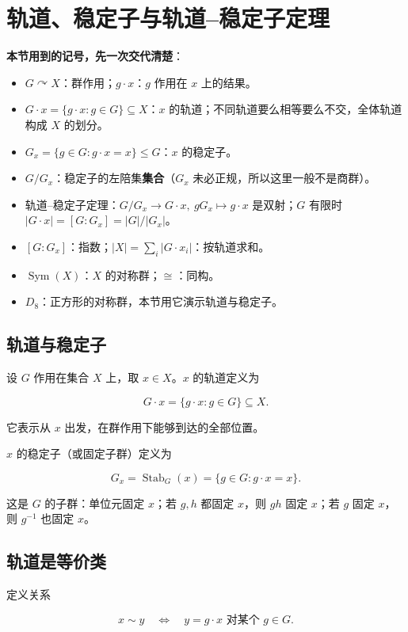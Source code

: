 \section{轨道、稳定子与轨道--稳定子定理}


\textbf{本节用到的记号，先一次交代清楚}：

\begin{itemize}
\item $G\curvearrowright X$：群作用；$g\cdot x$：$g$ 作用在 $x$ 上的结果。
\item $G\cdot x=\{g\cdot x:g\in G\}\subseteq X$：$x$ 的轨道；不同轨道要么相等要么不交，全体轨道构成 $X$ 的划分。
\item $G_x=\{g\in G:g\cdot x=x\}\le G$：$x$ 的稳定子。
\item $G/G_x$：稳定子的左陪集\textbf{集合}（$G_x$ 未必正规，所以这里一般不是商群）。
\item 轨道--稳定子定理：$G/G_x\to G\cdot x,\ gG_x\mapsto g\cdot x$ 是双射；$G$ 有限时 $|G\cdot x|=[G:G_x]=|G|/|G_x|$。
\item $[G:G_x]$：指数；$|X|=\sum_i|G\cdot x_i|$：按轨道求和。
\item $\operatorname{Sym}(X)$：$X$ 的对称群；$\cong$：同构。
\item $D_8$：正方形的对称群，本节用它演示轨道与稳定子。
\end{itemize}


\subsection{轨道与稳定子}


设 $G$ 作用在集合 $X$ 上，取 $x\in X$。$x$ 的轨道定义为

\[
G\cdot x=\{g\cdot x:g\in G\}\subseteq X.
\]

它表示从 $x$ 出发，在群作用下能够到达的全部位置。

$x$ 的稳定子（或固定子群）定义为

\[
G_x=\operatorname{Stab}_G(x)=\{g\in G:g\cdot x=x\}.
\]

这是 $G$ 的子群：单位元固定 $x$；若 $g,h$ 都固定 $x$，则 $gh$ 固定 $x$；若 $g$ 固定 $x$，则 $g^{-1}$ 也固定 $x$。

\subsection{轨道是等价类}


定义关系

\[
 x\sim y\quad\Longleftrightarrow\quad y=g\cdot x\text{ 对某个 }g\in G.
\]

